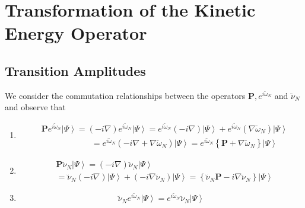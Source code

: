 \documentclass[aps,preprint]{revtex4}%
\begin{document}
\section{Transformation of the Kinetic Energy Operator\label{KinEnTrans}}

\subsection{Transition Amplitudes}

We consider the commutation relationships between the operators $\mathbf{P,}%
e^{i\breve{\omega}_{N}}$ and $\breve{\nu}_{N}$ and observe that

\begin{enumerate}
\item
\begin{align}
&  \mathbf{P}e^{i\breve{\omega}_{N}}\left\vert \Psi\right\rangle =\left(
-i\nabla\right)  e^{i\breve{\omega}_{N}}\left\vert \Psi\right\rangle
=e^{i\breve{\omega}_{N}}\left(  -i\nabla\right)  \left\vert \Psi\right\rangle
+e^{i\breve{\omega}_{N}}\left(  \nabla\breve{\omega}_{N}\right)  \left\vert
\Psi\right\rangle \nonumber\\
&  \qquad\qquad\qquad\left.  =\right.  e^{i\breve{\omega}_{N}}\left(
-i\nabla+\nabla\breve{\omega}_{N}\right)  \left\vert \Psi\right\rangle
=e^{i\breve{\omega}_{N}}\left\{  \mathbf{P}+\nabla\breve{\omega}_{N}\right\}
\left\vert \Psi\right\rangle
\end{align}


\item
\begin{align}
&  \mathbf{P}\breve{\nu}_{N}\left\vert \Psi\right\rangle =\left(
-i\nabla\right)  \breve{\nu}_{N}\left\vert \Psi\right\rangle \nonumber\\
&  =\breve{\nu}_{N}\left(  -i\nabla\right)  \left\vert \Psi\right\rangle
+\left(  -i\nabla\breve{\nu}_{N}\right)  \left\vert \Psi\right\rangle
=\left\{  \breve{\nu}_{N}\mathbf{P}-i\nabla\breve{\nu}_{N}\right\}  \left\vert
\Psi\right\rangle
\end{align}


\item
\begin{equation}
\breve{\nu}_{N}e^{i\breve{\omega}_{N}}\left\vert \Psi\right\rangle
=e^{i\breve{\omega}_{N}}\breve{\nu}_{N}\left\vert \Psi\right\rangle
\end{equation}

\end{enumerate}
\end{document}
